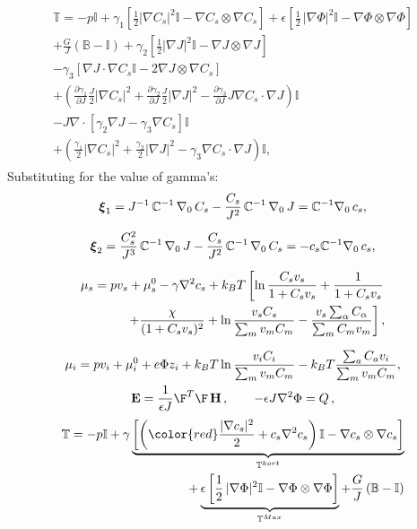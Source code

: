 \begin{gather}
\begin{aligned}
\mathbb{T}= -p \mathbb{I} + \gamma_1 \left[\frac{1}{2} |\nabla C_s|^2\mathbb{I} - \nabla C_s \otimes \nabla C_s\right]+ \epsilon \left[\frac{1}{2} \,|\nabla \Phi|^2\mathbb{I} -\nabla \Phi \otimes \nabla \Phi\right]\\
+ \frac{G}{J}\left(\mathbb{B}-\mathbb{I}\right)
+\gamma_2 \left[\frac{1}{2} |\nabla J|^2\mathbb{I} - \nabla J \otimes \nabla J\right]\\
-\gamma_3 \left[ \nabla J\cdot\nabla C_s \mathbb{I} - 2\nabla J \otimes \nabla C_s\right]\\
+\left(\frac{\partial \gamma_1}{\partial J}\frac{J}{2}\left|\nabla C_s\right|^2+\frac{\partial \gamma_2}{\partial J}\frac{J}{2}\left|\nabla J\right|^2-\frac{\partial \gamma_3}{\partial J}J\nabla C_s\cdot \nabla J\right)\mathbb{I}\\
-J \nabla\cdot [\gamma_2 \nabla J- \gamma_3 \nabla C_s]\mathbb{I}
\\
+\left(\frac{\gamma_1}{2}\left|\nabla C_s\right|^2+\frac{\gamma_2}{2}\left|\nabla J\right|^2-\gamma_3\nabla C_s\cdot \nabla J\right)\mathbb{I},
\end{aligned}
\label{sys3}
\end{gather}
Substituting for the value of gamma's:
\begin{gather}
\boldsymbol{\xi}_1 =  J^{-1} \,\mathbb{C}^{-1} \,\nabla_0 \,C_s-\frac{C_s}{J^2}  \,\mathbb{C}^{-1}\,\nabla_0 \,J=\mathbb{C}^{-1}\nabla_0\,c_s,\\[2mm]
\boldsymbol{\xi}_2 = \frac{C^2_s}{J^3} \,\mathbb{C}^{-1} \,\nabla_0 \,J-\frac{C_s}{J^2}  \,\mathbb{C}^{-1} \,\nabla_0 \,C_s =-c_s\mathbb{C}^{-1}\nabla_0\,c_s,\\[2mm]
\begin{aligned}
\mu_s = p v_s + \mu_s^0 - \gamma\nabla^2c_s + k_BT\left[\ln \frac{C_s v_s}{1+C_s v_s}+ \frac{1}{1+C_sv_s}
 \right.\\
\left.+\frac{\chi}{(1+C_s v_s)^2}+ \ln \frac{v_s C_s}{\sum_m v_mC_m} - \frac{v_s \sum_\alpha C_\alpha}{\sum_m C_m v_m} \right], 
\end{aligned}\\[2.5mm]
\mu_i = p v_i + \mu^0_i + e\Phi z_i + k_BT \ln \frac{v_iC_i}{\sum_m v_m C_m} - k_BT \frac{\sum_a C_a v_i}{\sum_m v_m C_m},\\
\mathbf{E} = \frac{1}{\epsilon J} \F^T \F\, \mathbf{H}\, , \qquad -\epsilon J \nabla^2 \Phi = Q\, ,
\end{gather}
\begin{gather}
\begin{aligned}
\mathbb{T}= -p \mathbb{I} +  \gamma\underbrace{\left[\left(\color{red}\frac{|\nabla c_s|^2}{2}+c_s\nabla^2c_s\right)\mathbb{I} - \nabla c_s \otimes \nabla c_s\right]}_{\mathbb{T}^{kort}}\\+ \underbrace{\epsilon \left[\frac{1}{2} \,|\nabla \Phi|^2\mathbb{I} -\nabla \Phi \otimes \nabla \Phi\right]}_{\mathbb{T}^{Max}}
+ \frac{G}{J}\left(\mathbb{B}-\mathbb{I}\right)
\end{aligned}
\end{gather}
